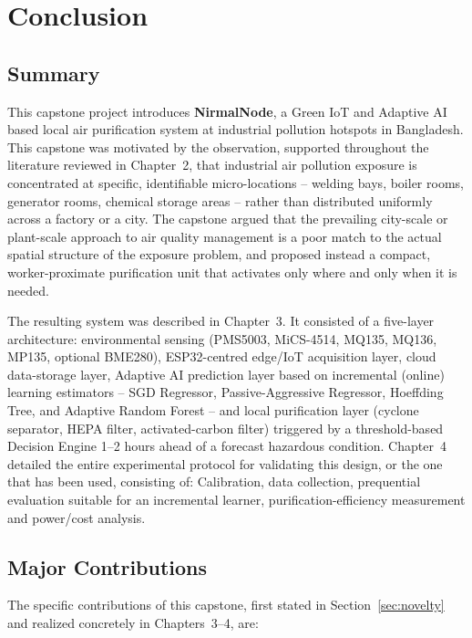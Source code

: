\chapter{Conclusion}
\label{ch:conclusion}

\section{Summary}
\label{sec:conc-summary}

This capstone project introduces \textbf{NirmalNode}, a Green IoT and Adaptive AI based local air purification system at industrial pollution hotspots in Bangladesh. This capstone was motivated by the observation, supported throughout the literature reviewed in Chapter~2, that industrial air pollution exposure is concentrated at specific, identifiable micro-locations -- welding bays, boiler rooms, generator rooms, chemical storage areas -- rather than distributed uniformly across a factory or a city. The capstone argued that the prevailing city-scale or plant-scale approach to air quality management is a poor match to the actual spatial structure of the exposure problem, and proposed instead a compact, worker-proximate purification unit that activates only where and only when it is needed.

The resulting system was described in Chapter~3. It consisted of a five-layer architecture: environmental sensing (PMS5003, MiCS-4514, MQ135, MQ136, MP135, optional BME280), ESP32-centred edge/IoT acquisition layer, cloud data-storage layer, Adaptive AI prediction layer based on incremental (online) learning estimators -- SGD Regressor, Passive-Aggressive Regressor, Hoeffding Tree, and Adaptive Random Forest -- and local purification layer (cyclone separator, HEPA filter, activated-carbon filter) triggered by a threshold-based Decision Engine 1--2 hours ahead of a forecast hazardous condition. Chapter~4 detailed the entire experimental protocol for validating this design, or the one that has been used, consisting of: Calibration, data collection, prequential evaluation suitable for an incremental learner, purification-efficiency measurement and power/cost analysis.

\section{Major Contributions}
\label{sec:conc-contributions}

The specific contributions of this capstone, first stated in Section~\ref{sec:novelty} and realized concretely in Chapters~3--4, are:

